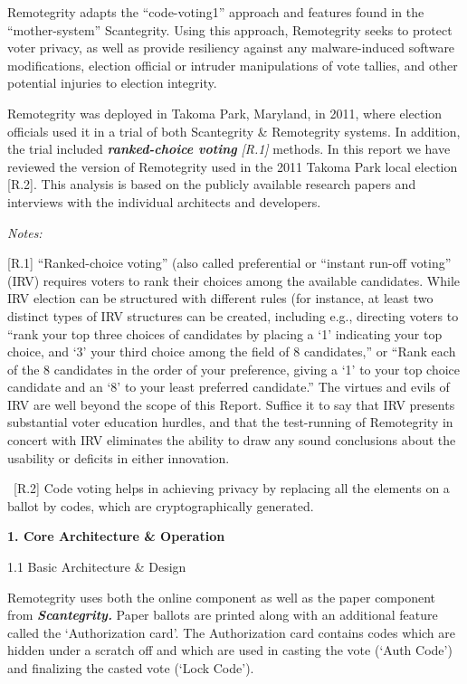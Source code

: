 Remotegrity adapts the ``code-voting1'' approach and features found in the ``mother-system'' Scantegrity. Using this approach, Remotegrity seeks to protect voter privacy, as well as provide resiliency against any malware-induced software modifications, election official or intruder manipulations of vote tallies, and other potential injuries to election integrity.

Remotegrity was deployed in Takoma Park, Maryland, in 2011, where election officials used it in a trial of both Scantegrity \& Remotegrity systems. In addition, the trial included \textbf{\textit{ranked-choice voting }}\textit{[R.1]}\textbf{\textit{ }}methods. In this report we have reviewed the version of Remotegrity used in the 2011 Takoma Park local election [R.2]. This analysis is based on the publicly available research papers and interviews with the individual architects and developers.

\textit{Notes:}

[R.1] ``Ranked-choice voting'' (also called preferential or ``instant run-off voting'' (IRV) requires voters to rank their choices among the available candidates. While IRV election can be structured with different rules (for instance, at least two distinct types of IRV structures can be created, including e.g., directing voters to ``rank your top three choices of candidates by placing a `1' indicating your top choice, and `3' your third choice among the field of 8 candidates,'' or ``Rank each of the 8 candidates in the order of your preference, giving a `1' to your top choice candidate and an `8' to your least preferred candidate.'' The virtues and evils of IRV are well beyond the scope of this Report. Suffice it to say that IRV presents substantial voter education hurdles, and that the test-running of Remotegrity in concert with IRV eliminates the ability to draw any sound conclusions about the usability or deficits in either innovation.

\ [R.2] Code voting helps in achieving privacy by replacing all the elements on a ballot by codes, which are cryptographically generated.


\bigskip

\textbf{1. Core Architecture \& Operation}

1.1 Basic Architecture \& Design

Remotegrity uses both the online component as well as the paper component from \textbf{\textit{Scantegrity. }}Paper ballots are printed along with an additional feature called the `Authorization card'. The Authorization card contains codes which are hidden under a scratch off and which are used in casting the vote (`Auth Code') and finalizing the casted vote (`Lock Code').

